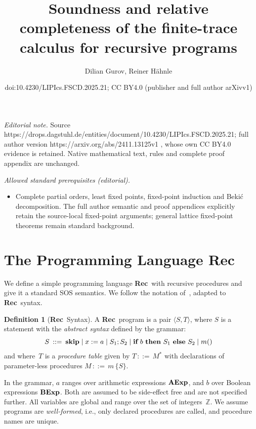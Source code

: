 \documentclass[10pt,a4paper]{amsart}
\title{Soundness and relative completeness of the finite-trace calculus for recursive programs}
\author{Dilian Gurov, Reiner Hähnle}
\date{doi:10.4230/LIPIcs.FSCD.2025.21; CC BY4.0 (publisher and full author arXivv1)}
\theoremstyle{definition}
\newtheorem{definition}[theorem]{Definition}
\newcommand{\Rec}{\mbox{\bf Rec}}
\newcommand{\AExp}{\mbox{\bf AExp}}
\newcommand{\BExp}{\mbox{\bf BExp}}
\newcommand{\Skip}{\mbox{\bf skip}}
\newcommand{\If}{\mbox{\bf if}}
\newcommand{\Then}{\mbox{\bf then}}
\newcommand{\Else}{\mbox{\bf else}}
\begin{document}
\maketitle
\setcounter{section}{1}
\noindent\textit{Editorial note.} Source https://drops.dagstuhl.de/entities/document/10.4230/LIPIcs.FSCD.2025.21; full author version https://arxiv.org/abs/2411.13125v1 , whose own CC BY4.0 evidence is retained. Native mathematical text, rules and complete proof appendix are unchanged.\par\medskip
\noindent\textit{Allowed standard prerequisites (editorial).}\begin{itemize}
\item Complete partial orders, least fixed points, fixed-point induction and Bekić decomposition. The full author semantic and proof appendices explicitly retain the source-local fixed-point arguments; general lattice fixed-point theorems remain standard background.
\end{itemize}\medskip
\section{The Programming Language \Rec}
\label{sec:rec}

We define a simple programming language \Rec\ with recursive
procedures and give it a standard SOS semantics.  We follow the
notation of~\cite{nie-nie-07-book}, adapted to \Rec\ syntax.
%
\begin{definition}[\Rec\ Syntax]
  \label{def:rec-syntax}
  A \Rec\ program is a pair $\langle S, T\rangle$, where $S$ is a
  statement with the \emph{abstract syntax} defined by the grammar:
  $$
  S \>::=\> \Skip \mid 
  x := a \mid 
  S_1 ; S_2 \mid 
  \If\ b\ \Then\ S_1\ \Else\ S_2 \mid 
  m()
  $$
  and where~$T$ is a \emph{procedure table} given by $T\,::=\,M^\ast$ with
  declarations of parameter-less procedures $M\,::=\,m\,\{S\}$.

  In the grammar, $a$ ranges over arithmetic expressions $\AExp$, and
  $b$ over Boolean expressions $\BExp$. Both are assumed to be
  side-effect free and are not specified further. All variables are
  global and range over the set of integers~$\mathbb{Z}$. We assume
  programs are \emph{well-formed}, i.e., only declared procedures are
  called, and procedure names are unique.
\end{definition}
\end{document}
